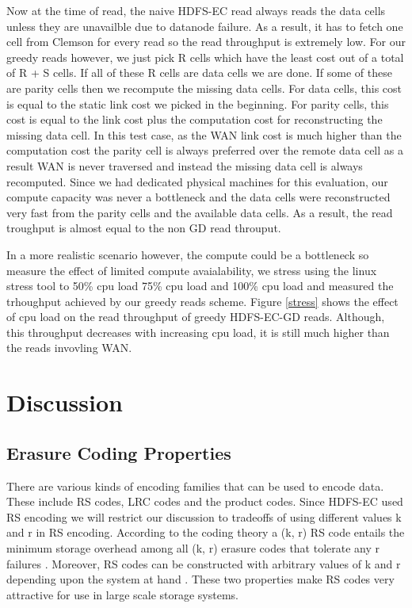 \documentclass{sig-alternate-05-2015}
\begin{document}
Now at the time of read, the naive HDFS-EC read always reads the data cells unless they are unavailble due to datanode failure. %
As a result, it has to fetch one cell from Clemson for every read so the read throughput is extremely low. For our greedy reads however, we just pick R cells which have the least cost out of a total of R + S cells. If all of these R cells are data cells we are done. If some of these are parity cells then we recompute the missing data cells. For data cells, this cost is equal to the static link cost we picked in the beginning. For parity cells, this cost is equal to the link cost plus the computation cost for reconstructing the missing data cell. In this test case, as the WAN link cost is much higher than the computation cost the parity cell is always preferred over the remote data cell as a result WAN is never traversed and instead the missing data cell is always recomputed. Since we had dedicated physical machines for this evaluation, our compute capacity was never a bottleneck and the data cells were reconstructed very fast from the parity cells and the available data cells. As a result, the read troughput is almost equal to the non GD read throuput. 

In a more realistic scenario however, the compute could be a bottleneck so measure the effect of limited compute avaialability, we stress using the linux stress tool to 50\% cpu load 75\% cpu load and 100\% cpu load and measured the trhoughput achieved by our greedy reads scheme. Figure  \ref{stress} shows the effect of cpu load on the read throughput of greedy HDFS-EC-GD reads. Although, this throughput decreases with increasing cpu load, it is still much higher than the reads invovling WAN. 

\section{Discussion}

\subsection{Erasure Coding Properties}

There are various kinds of encoding families that can be used to encode data. These include RS codes, LRC codes and the product codes. Since HDFS-EC used RS encoding we will restrict our discussion to tradeoffs of using different values k and r in RS encoding. According to the coding theory a (k, r) RS code entails the minimum storage overhead among all (k, r) erasure codes that tolerate any r failures \cite{hitchhiker}. Moreover, RS codes can be constructed with arbitrary values of k and r depending upon the system at hand \cite{hitchhiker}. These two properties make RS codes very attractive for use in large scale storage systems. 
\end{document}
